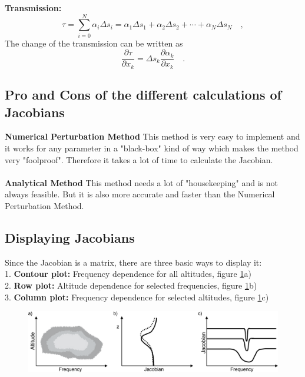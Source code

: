 \textbf{Transmission:}
\begin{equation}
\tau=\sum_{i=0}^N \alpha_i \Delta s_i = \alpha_1 \Delta s_1 + \alpha_2 \Delta
s_2 + \cdots + \alpha_N \Delta s_N \quad ,
\end{equation}
The change of the transmission can be written as
\begin{equation*}
\frac{\partial \tau}{\partial x_k}=\Delta s_k \frac{\partial \alpha_k}{\partial
	x_k} \quad .
\end{equation*}

\subsection*{Pro and Cons of the different calculations of Jacobians}
\textbf{Numerical Perturbation Method}
This method is very easy to implement and it works for any parameter in a
"black-box" kind of way which makes the method very "foolproof". Therefore it
takes a lot of time to calculate the Jacobian.
\\\\
\textbf{Analytical Method}
This method needs a lot of "housekeeping" and is not always feasible. But it is
also more accurate and faster than the Numerical Perturbation Method.

\subsection*{Displaying Jacobians}
Since the Jacobian is a matrix, there are three basic ways to display it:\\
1. \textbf{Contour plot:} Frequency dependence for all altitudes, figure
\ref{fig:plotTypes}a)\\
2. \textbf{Row plot:} Altitude dependence for selected frequencies, figure
\ref{fig:plotTypes}b)\\
3. \textbf{Column plot:} Frequency dependence for selected altitudes, figure
\ref{fig:plotTypes}c)

\begin{figure}
	\centering
	\includegraphics[width=\textwidth]{./figures/plotTypes_Jacobian}
	\caption{}
	\label{fig:plotTypes}
\end{figure}

